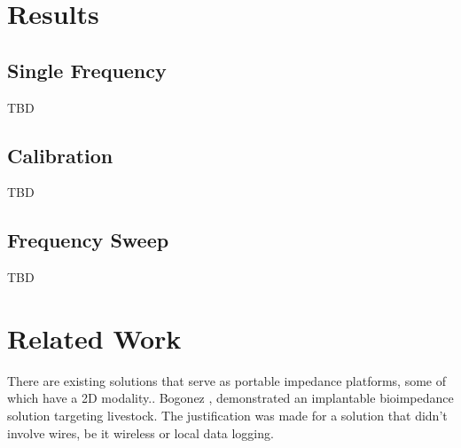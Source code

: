 \documentclass[]{IEEEtran}
\begin{document}
\section{Results}
\subsection{Single Frequency}
TBD
\subsection{Calibration}
TBD
\subsection{Frequency Sweep}
TBD


\section {Related Work}
There are existing solutions that serve as portable impedance platforms, some of which have a 2D modality.. Bogonez \cite{bogonez-franco_implantable_2009}, \cite{bogonez-franco_implantable_2012} demonstrated an implantable bioimpedance solution targeting livestock. The justification was made for a solution that didn't involve wires, be it wireless or local data logging.  



%
%

\end{document}

